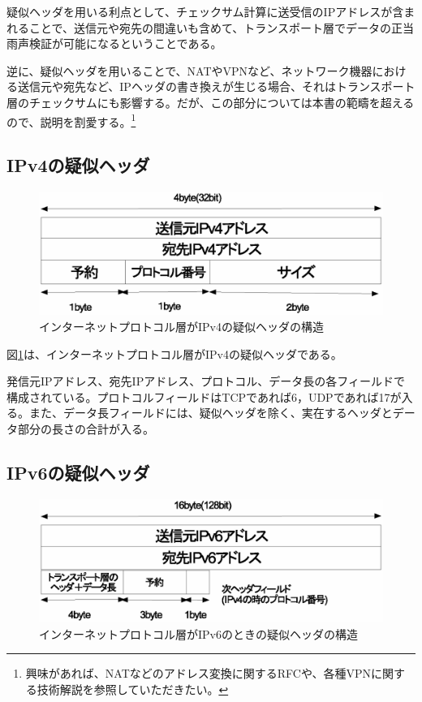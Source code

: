疑似ヘッダを用いる利点として、チェックサム計算に送受信のIPアドレスが含まれることで、送信元や宛先の間違いも含めて、トランスポート層でデータの正当雨声検証が可能になるということである。

逆に、疑似ヘッダを用いることで、NATやVPNなど、ネットワーク機器における送信元や宛先など、IPヘッダの書き換えが生じる場合、それはトランスポート層のチェックサムにも影響する。だが、この部分については本書の範疇を超えるので、説明を割愛する。\footnote{興味があれば、NATなどのアドレス変換に関するRFCや、各種VPNに関する技術解説を参照していただきたい。}

\subsection{IPv4の疑似ヘッダ}

\begin{figure}[htbp]
	\includegraphics[width=12cm,clip]{draw/pseudoheader4.eps}
	\caption{インターネットプロトコル層がIPv4の疑似ヘッダの構造}
	\label{fig:pseudo}
\end{figure}

図\ref{fig:pseudo}は、インターネットプロトコル層がIPv4の疑似ヘッダである。

発信元IPアドレス、宛先IPアドレス、プロトコル、データ長の各フィールドで構成されている。プロトコルフィールドはTCPであれば6，UDPであれば17が入る。また、データ長フィールドには、疑似ヘッダを除く、実在するヘッダとデータ部分の長さの合計が入る。

\subsection{IPv6の疑似ヘッダ}

\begin{figure}[htbp]
	\includegraphics[width=12cm,clip]{draw/pseudoheader6.eps}
	\caption{インターネットプロトコル層がIPv6のときの疑似ヘッダの構造}
	\label{fig:pseudo6}
\end{figure}

